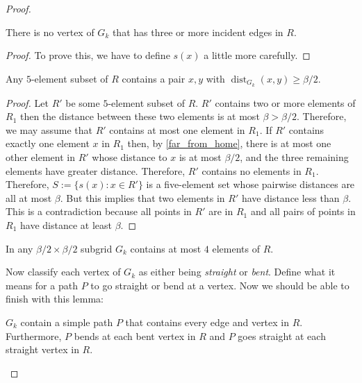 \documentclass{patmorin}
\DeclareMathOperator{\dist}{dist}
\begin{document}
\begin{proof}
  \begin{clm}
      There is no vertex of $G_k$ that has three or more incident edges in $R$.
  \end{clm}
  
  \begin{proof}
    To prove this, we have to define $s(x)$ a little more carefully.
  \end{proof}
    
  \begin{clm}
    Any $5$-element subset of $R$ contains a pair $x,y$ with $\dist_{G_k}(x,y)\ge\beta/2$.
  \end{clm}
  
  \begin{proof}
    Let $R'$ be some $5$-element subset of $R$. $R'$ contains two or more elements of $R_1$ then the distance between these two elements is at most $\beta>\beta/2$.  Therefore, we may assume that $R'$ contains at most one element in $R_1$.  If $R'$ contains exactly one element $x$ in $R_1$ then, by \cref{far_from_home}, there is at most one other element in $R'$ whose distance to $x$ is at most $\beta/2$, and the three remaining elements have greater distance.  Therefore, $R'$ contains no elements in $R_1$.  Therefore, $S:=\{s(x):x\in R'\}$ is a five-element set whose pairwise distances are all at most $\beta$.  But this implies that two elements in $R'$ have distance less than $\beta$.  This is a contradiction because all points in $R'$ are in $R_1$ and all pairs of points in $R_1$ have distance at least $\beta$.
  \end{proof}
  
  \begin{cor}
      In any $\beta/2\times \beta/2$ subgrid $G_k$ contains at most $4$ elements of $R$.
  \end{cor}
    
    Now classify each vertex of $G_k$ as either being \emph{straight} or \emph{bent}. Define what it means for a path $P$ to go straight or bend at a vertex.  Now we should be able to finish with this lemma:
    
    \begin{lem}
        $G_k$ contain a simple path $P$ that contains every edge and vertex in $R$.  Furthermore, $P$ bends at each bent vertex in $R$ and $P$ goes straight at each straight vertex in $R$. 
    \end{lem}
\end{proof}









\end{document}
